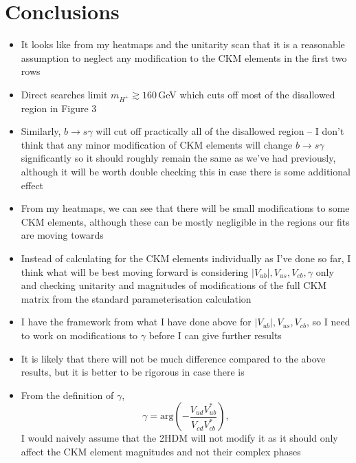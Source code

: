 \documentclass[11pt]{article}
\begin{document}
\section{Conclusions}
\begin{itemize}
    \item It looks like from my heatmaps and the unitarity scan that it is a reasonable assumption to neglect any modification to the CKM elements in the first two rows
    \item Direct searches limit $m_{H^+}\gtrsim160\,$GeV which cuts off most of the disallowed region in Figure 3
    \item Similarly, $b\to s\gamma$ will cut off practically all of the disallowed region -- I don't think that any minor modification of CKM elements will change $b\to s\gamma$ significantly so it should roughly remain the same as we've had previously, although it will be worth double checking this in case there is some additional effect
    \item From my heatmaps, we can see that there will be small modifications to some CKM elements, although these can be mostly negligible in the regions our fits are moving towards 
    \item Instead of calculating for the CKM elements individually as I've done so far, I think what will be best moving forward is considering $|V_{ub}|,V_{us},V_{cb},\gamma$ only and checking unitarity and magnitudes of modifications of the full CKM matrix from the standard parameterisation calculation
    \item I have the framework from what I have done above for $|V_{ub}|,V_{us},V_{cb}$, so I need to work on modifications to $\gamma$ before I can give further results 
    \item It is likely that there will not be much difference compared to the above results, but it is better to be rigorous in case there is
    \item From the definition of $\gamma$,
        \begin{equation*}
            \gamma = \text{arg}\left(-\frac{V_{ud}V_{ub}^*}{V_{cd}V_{cb}^*}\right),
        \end{equation*}
        I would naively assume that the 2HDM will not modify it as it should only affect the CKM element magnitudes and not their complex phases 
\end{itemize}
\end{document}

